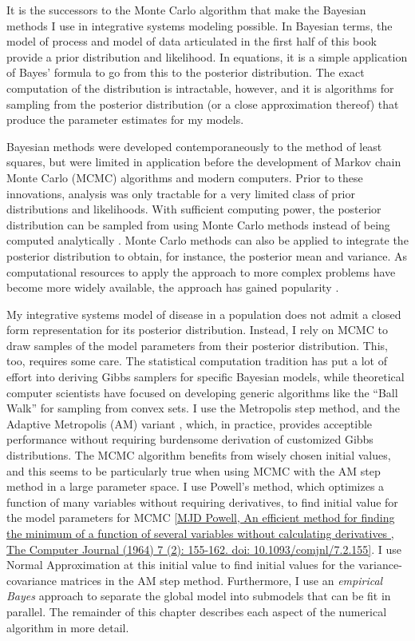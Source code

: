 It is the successors to the Monte Carlo algorithm that make the
Bayesian methods I use in integrative systems modeling possible.  In
Bayesian terms, the model of process and model of data articulated in
the first half of this book provide a prior distribution and
likelihood.  In equations, it is a simple application of Bayes'
formula to go from this to the posterior distribution.  The exact
computation of the distribution is intractable, however, and it is
algorithms for sampling from the posterior distribution (or a close
approximation thereof) that produce the parameter estimates for my
models.

Bayesian methods were developed contemporaneously to the method of
least squares, but were limited in application before the development
of Markov chain Monte Carlo (MCMC) algorithms and modern computers.
Prior to these innovations, analysis was only tractable for a very
limited class of prior distributions and likelihoods. With sufficient
computing power, the posterior distribution can be sampled from using
Monte Carlo methods instead of being computed analytically
\cite{Gelman_Bayesian_2003}. Monte Carlo methods can also be applied
to integrate the posterior distribution to obtain, for instance, the
posterior mean and variance. As computational resources to apply the
approach to more complex problems have become more widely available,
the approach has gained popularity \cite{Tanner_From_2010}.

My integrative systems model of disease in a population does not admit
a closed form representation for its posterior distribution.  Instead,
I rely on MCMC to draw samples of the model parameters from their
posterior distribution.  This, too, requires some care.  The
statistical computation tradition has put a lot of effort into
deriving Gibbs samplers for specific Bayesian models, while
theoretical computer scientists have focused on developing generic
algorithms like the ``Ball Walk'' for sampling from convex sets.  I
use the Metropolis step method, and the Adaptive Metropolis (AM)
variant \cite{Haario_Adaptive_2001}, which, in practice, provides
acceptible performance without requiring burdensome derivation of
customized Gibbs distributions. The MCMC algorithm benefits from
wisely chosen initial values, and this seems to be particularly true
when using MCMC with the AM step method in a large parameter space. I
use Powell's method, which optimizes a function of many variables
without requiring derivatives, to find initial value for the model
parameters for MCMC \ref{MJD Powell, An efficient method for finding
  the minimum of a function of several variables without calculating
  derivatives , The Computer Journal (1964) 7 (2): 155-162.  doi:
  10.1093/comjnl/7.2.155}.  I use Normal Approximation at this initial
value to find initial values for the variance-covariance matrices in
the AM step method.  Furthermore, I use an \emph{empirical Bayes}
approach to separate the global model into submodels that can be fit
in parallel.  The remainder of this chapter describes each aspect of
the numerical algorithm in more detail.

